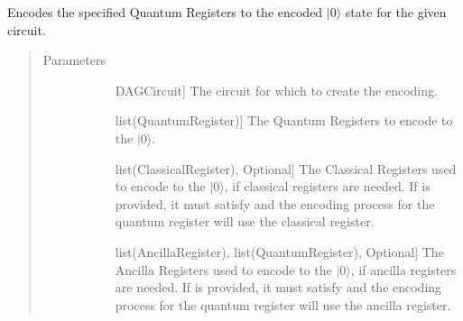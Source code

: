 \documentclass[letterpaper,10pt,english]{sphinxmanual}
\begin{document}
\begin{fulllineitems}
\begin{fulllineitems}
\label{\detokenize{Steane:Steane.SteaneEncoder.getEncoderCircuit}}
Encodes the specified Quantum Registers to the encoded \(|0\rangle\) state for the given circuit.
\begin{quote}\begin{description}
\item[{Parameters}] \leavevmode\begin{description}
\item[{}] \leavevmode{[}DAGCircuit{]}
The circuit for which to create the encoding.

\item[{}] \leavevmode{[}list(QuantumRegister){]}
The Quantum Registers to encode to the \(|0\rangle\).

\item[{}] \leavevmode{[}list(ClassicalRegister), Optional{]}
The Classical Registers used to encode to the \(|0\rangle\), if classical registers are needed. If  is provided, it must satisfy  and the encoding process for the  quantum register will use the  classical register.

\item[{}] \leavevmode{[}list(AncillaRegister), list(QuantumRegister), Optional{]}
The Ancilla Registers used to encode to the \(|0\rangle\), if ancilla registers are needed. If  is provided, it must satisfy  and the encoding process for the  quantum register will use the  ancilla register.

\end{description}

\end{description}\end{quote}

\end{fulllineitems}


\end{fulllineitems}
\end{document}
